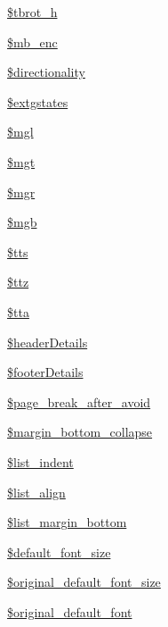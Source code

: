 \begin{DoxyCompactItemize}
\hyperlink{classm_p_d_f_aecfd87e454dabf61e8032a76e403fc33}{\$tbrot\-\_\-h}
\item 
\hyperlink{classm_p_d_f_a23d00464ed9c6b2c926bb82373e60a9a}{\$mb\-\_\-enc}
\item 
\hyperlink{classm_p_d_f_aa8c49884bb9ba37e215435e4ccbedbd3}{\$directionality}
\item 
\hyperlink{classm_p_d_f_abe6b86ee68a89dbd129eb3270b0c14af}{\$extgstates}
\item 
\hyperlink{classm_p_d_f_a7f894210581b4f636ef8d71719c9c0dc}{\$mgl}
\item 
\hyperlink{classm_p_d_f_a80fb6dc0cec8c1edaddfa87f47589abc}{\$mgt}
\item 
\hyperlink{classm_p_d_f_a5eaeea9417e7c5d6aff2c545c23a98a1}{\$mgr}
\item 
\hyperlink{classm_p_d_f_a670402dbc0e6fc7d191b32183200d64c}{\$mgb}
\item 
\hyperlink{classm_p_d_f_a66884747ce7e880ea8e6798514529e64}{\$tts}
\item 
\hyperlink{classm_p_d_f_af54c65ead3e6f3b9f6b57868e289470e}{\$ttz}
\item 
\hyperlink{classm_p_d_f_a7da280df95e9c7e9eef0c55b3322102e}{\$tta}
\item 
\hyperlink{classm_p_d_f_aa8fe296e3fda62d2f405586fe3185ab2}{\$header\-Details}
\item 
\hyperlink{classm_p_d_f_a125a3bfb0067de7a1a750008c23d3ccd}{\$footer\-Details}
\item 
\hyperlink{classm_p_d_f_a974bc094f6f697ae491cc283eee42cea}{\$page\-\_\-break\-\_\-after\-\_\-avoid}
\item 
\hyperlink{classm_p_d_f_a4502be9578634cd40b9356521c72c3fb}{\$margin\-\_\-bottom\-\_\-collapse}
\item 
\hyperlink{classm_p_d_f_ab22d2de37786798d99bd84c6ee7f9c03}{\$list\-\_\-indent}
\item 
\hyperlink{classm_p_d_f_a3a5c4d84763f3b80b19b554ce20c71c5}{\$list\-\_\-align}
\item 
\hyperlink{classm_p_d_f_a09e714e258ef6408b945ab7f71048f04}{\$list\-\_\-margin\-\_\-bottom}
\item 
\hyperlink{classm_p_d_f_ac8085225288a40f9fcc61e07157093a1}{\$default\-\_\-font\-\_\-size}
\item 
\hyperlink{classm_p_d_f_a550c518f17e95765778aa90813a38f97}{\$original\-\_\-default\-\_\-font\-\_\-size}
\item 
\hyperlink{classm_p_d_f_a1e1a1ec2da0c5ef42464fdfa83e9b6dd}{\$original\-\_\-default\-\_\-font}
\item 

\end{DoxyCompactItemize}
